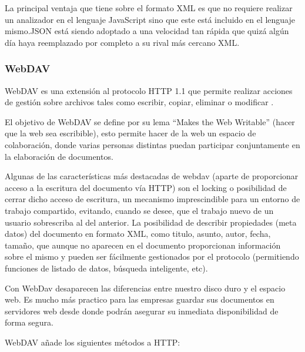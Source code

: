 La principal ventaja que tiene sobre el formato XML es que no requiere realizar un analizador en el lenguaje JavaScript sino que este está incluido en el lenguaje mismo.\newline JSON está siendo adoptado a una velocidad tan rápida que quizá algún día haya reemplazado por completo a su rival más cercano XML.


\subsubsection*{WebDAV \cite{webdav} }
\label{tec:webdav}

WebDAV es una extensión al protocolo HTTP 1.1 que permite realizar acciones de gestión sobre archivos tales como escribir, copiar, eliminar o modificar \cite{webdav_rfc}.

El objetivo de WebDAV se define por su lema ``Makes the Web Writable'' (hacer que la web sea escribible), esto permite hacer de la web un espacio de colaboración, donde varias personas distintas puedan participar conjuntamente en la elaboración de documentos.

Algunas de las características más destacadas de webdav (aparte de proporcionar acceso a la escritura del documento vía HTTP) son el locking o posibilidad de cerrar dicho acceso de escritura, un mecanismo imprescindible para un entorno de trabajo compartido, evitando, cuando se desee, que el trabajo nuevo de un usuario sobrescriba al del anterior. La posibilidad de describir propiedades (meta datos) del documento en formato XML, como titulo, asunto, autor, fecha, tamaño, que aunque no aparecen en el documento proporcionan información sobre el mismo y pueden ser fácilmente gestionados por el protocolo (permitiendo funciones de listado de datos, búsqueda inteligente, etc).

Con WebDav desaparecen las diferencias entre nuestro disco duro y el espacio web. Es mucho más practico para las empresas guardar sus documentos en servidores web desde donde podrán asegurar su inmediata disponibilidad de forma segura.

WebDAV añade los siguientes métodos a HTTP:

